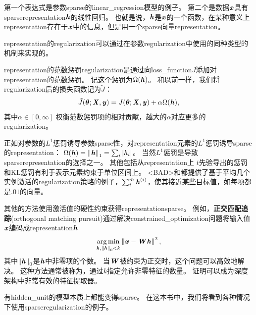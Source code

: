 
第一个表达式是参数\gls{sparse}的\gls{linear_regression}模型的例子。
第二个是数据$\boldsymbol{\mathit{x}}$具有\gls{sparse}\gls{representation}$\boldsymbol{\mathit{h}}$的线性回归。
也就是说，$\boldsymbol{\mathit{h}}$是$\boldsymbol{\mathit{x}}$的一个函数，在某种意义上\gls{representation}存在于$\boldsymbol{\mathit{x}}$中的信息，但是用一个\gls{sparse}向量\gls{representation}。

\gls{representation}的\gls{regularization}可以通过在参数\gls{regularization}中使用的同种类型的机制来实现的。

\gls{representation}的范数惩罚\gls{regularization}是通过向\gls{loss_function}$J$添加对\gls{representation}的范数惩罚。
记这个惩罚为$\Omega(\boldsymbol{\mathit{h}})$。
和以前一样，我们将\gls{regularization}后的损失函数记为$\tilde J$：
\begin{align}
 \tilde J(\boldsymbol{\theta}; \boldsymbol{\mathit{X}}, \boldsymbol{\mathit{y}}) =  J(\boldsymbol{\theta}; \boldsymbol{\mathit{X}}, \boldsymbol{\mathit{y}})  + \alpha \Omega(\boldsymbol{\mathit{h}}),
\end{align}
其中$\alpha \in [0, \infty]$ 权衡范数惩罚项的相对贡献，越大的$\alpha$对应更多的\gls{regularization}。

正如对参数的$L^1$惩罚诱导参数\gls{sparse}性，对\gls{representation}元素的$L^1$惩罚诱导\gls{sparse}的\gls{representation}：
$\Omega(\boldsymbol{\mathit{h}}) = \left\lVert\boldsymbol{\mathit{h}}\right\rVert_1 = \sum_i |h_i|$。
当然$L^1$惩罚是导致\gls{sparse}\gls{representation}的选择之一。
其他包括从\gls{representation}上 $t$先验导出的惩罚\citep{Olshausen+Field-1996,Bergstra-Phd-2011}和\gls{KL}惩罚\citep{Larochelle+Bengio-2008}有利于表示元素约束于单位区间上。
<BAD>\cite{HonglakL2008-small}和\cite{Goodfellow2009}都提供了基于平均几个实例激活的\gls{regularization}策略的例子，$\sum_i^m \boldsymbol{\mathit{h}}^{(i)}$，使其接近某些目标值，如每项都是$.01$的向量。

其他的方法使用激活值的硬性约束获得\gls{representation}\gls{sparse}。
例如，\textbf{正交匹配追踪}(orthogonal matching pursuit)\citep{pati93orthogonal}通过解决\gls{constrained_optimization}问题将输入值$\boldsymbol{\mathit{x}}$编码成\gls{representation}$\boldsymbol{\mathit{h}}$
\begin{align}
 \underset{\boldsymbol{\mathit{h}}, \left\lVert\boldsymbol{\mathit{h}}\right\rVert_0 < k}{\arg\min} \left\lVert\boldsymbol{\mathit{x}} - \boldsymbol{\mathit{W}} \boldsymbol{\mathit{h}}\right\rVert^2,
\end{align}
其中$\left\lVert\boldsymbol{\mathit{h}}\right\rVert_0 $是$\boldsymbol{\mathit{h}}$中非零项的个数。
当$\boldsymbol{\mathit{W}}$被约束为正交时，这个问题可以高效地解决。
这种方法通常被称为，通过$k$指定允许非零特征的数量。
\cite{Coates2011b}证明可以成为深度架构中非常有效的特征提取器。


有\gls{hidden_unit}的模型本质上都能变得\gls{sparse}。
在这本书中，我们将看到各种情况下使用\gls{sparse}\gls{regularization}的例子。

